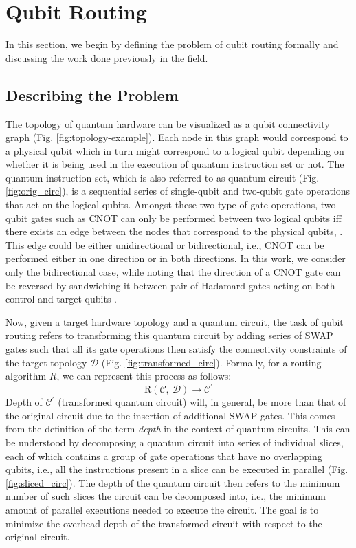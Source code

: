 \documentclass[%
 reprint,
amsmath,amssymb,
pra,
]{revtex4-2}
\begin{document}
\section{\label{sec:qubit-routing}Qubit Routing}
In this section, we begin by defining the problem of qubit routing formally and discussing the work done previously in the field.

\subsection{\label{sec:intro-defn}Describing the Problem}
The topology of quantum hardware can be visualized as a qubit connectivity graph (Fig. \ref{fig:topology-example}). Each node in this graph would correspond to a physical qubit which in turn might correspond to a logical qubit depending on whether it is being used in the execution of quantum instruction set or not. The quantum instruction set, which is also referred to as quantum circuit (Fig. \ref{fig:orig_circ}), is a sequential series of single-qubit and two-qubit gate operations that act on the logical qubits. Amongst these two type of gate operations, two-qubit gates such as CNOT can only be performed between two logical qubits iff there exists an edge between the nodes that correspond to the physical qubits, \citep{qroute_dqn1}. This edge could be either unidirectional or bidirectional, i.e., CNOT can be performed either in one direction or in both directions. In this work, we consider only the bidirectional case, while noting that the direction of a CNOT gate can be reversed by sandwiching it between pair of Hadamard gates acting on both control and target qubits \cite{utk_equiv_circuits}. 

Now, given a target hardware topology and a quantum circuit, the task of qubit routing refers to transforming this quantum circuit by adding series of SWAP gates such that all its gate operations then satisfy the connectivity constraints of the target topology $\mathcal{D}$ (Fig. \ref{fig:transformed_circ}). Formally, for a routing algorithm $R$, we can represent this process as follows:
\begin{equation}
\textrm{R}(\mathcal{C},\ \mathcal{D}) \rightarrow \mathcal{C}^{\prime}
\end{equation}
Depth of $\mathcal{C}^{\prime}$ (transformed quantum circuit) will, in general, be more than that of the original circuit due to the insertion of additional SWAP gates. This comes from the definition of the term \textit{depth} in the context of quantum circuits. This can be understood by decomposing a quantum circuit into series of individual slices, each of which contains a group of gate operations that have no overlapping qubits, i.e., all the instructions present in a slice can be executed in parallel (Fig. \ref{fig:sliced_circ}). The depth of the quantum circuit then refers to the minimum number of such slices the circuit can be decomposed into, i.e., the minimum amount of parallel executions needed to execute the circuit. The goal is to minimize the overhead depth of the transformed circuit with respect to the original circuit.
\end{document}
